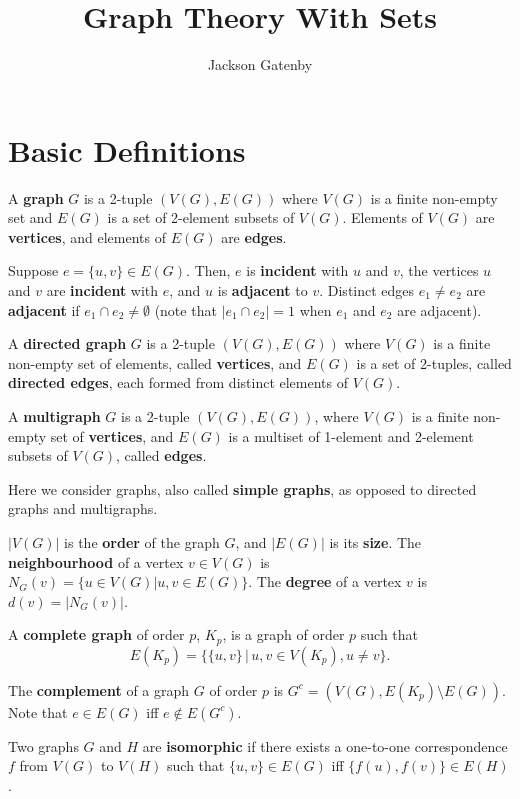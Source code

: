\documentclass[a4paper,12pt]{article}
\begin{document}
\title{Graph Theory With Sets}
\author{Jackson Gatenby}
\maketitle

\section{Basic Definitions}

A {\bf graph} $G$ is a 2-tuple $(V(G), E(G))$ where $V(G)$ is a finite non-empty
set and $E(G)$ is a set of 2-element subsets of $V(G)$. Elements of $V(G)$ are
{\bf vertices}, and elements of $E(G)$ are {\bf edges}.

Suppose $e = \{u, v\} \in E(G)$. Then, $e$ is {\bf incident} with $u$ and $v$, the
vertices $u$ and $v$ are {\bf incident} with $e$, and $u$ is {\bf adjacent}
to $v$. Distinct edges $e_1 \neq e_2$ are {\bf adjacent} if $e_1 \cap e_2 \neq
\emptyset$ (note that $|e_1 \cap e_2| = 1$ when $e_1$ and $e_2$ are adjacent).

A {\bf directed graph} $G$ is a 2-tuple $(V(G), E(G))$ where $V(G)$ is a finite
non-empty set of elements, called {\bf vertices}, and $E(G)$ is a set of
2-tuples, called {\bf directed edges}, each formed from distinct
elements of $V(G)$.

A {\bf multigraph} $G$ is a 2-tuple $(V(G), E(G))$, where $V(G)$ is a finite
non-empty set of {\bf vertices}, and $E(G)$ is a multiset of 1-element and
2-element subsets of $V(G)$, called {\bf edges}.

Here we consider graphs, also called {\bf simple graphs}, as opposed to
directed graphs and multigraphs.

$|V(G)|$ is the {\bf order} of the graph $G$, and $|E(G)|$ is its {\bf size}.
The {\bf neighbourhood} of a vertex $v \in V(G)$ is
$N_G(v) = \{u \in V(G) | {u,v} \in E(G)\}$.
The {\bf degree} of a vertex $v$ is $d(v) = |N_G(v)|$.

A {\bf complete graph} of order $p$, $K_p$, is a graph of order $p$ such that
\[ E(K_p) = \{\{u, v\} \,|\, u, v \in V(K_p), u \neq v\}. \]

The {\bf complement} of a graph $G$ of order $p$ is
$G^c = (V(G), E(K_p) \setminus E(G))$. Note that $e \in E(G)$ iff $e \not\in E(G^c)$.

Two graphs $G$ and $H$ are {\bf isomorphic} if there exists a one-to-one
correspondence $f$ from $V(G)$ to $V(H)$ such that $\{u, v\} \in E(G)$ iff
$\{f(u), f(v)\} \in E(H)$.
\end{document}
